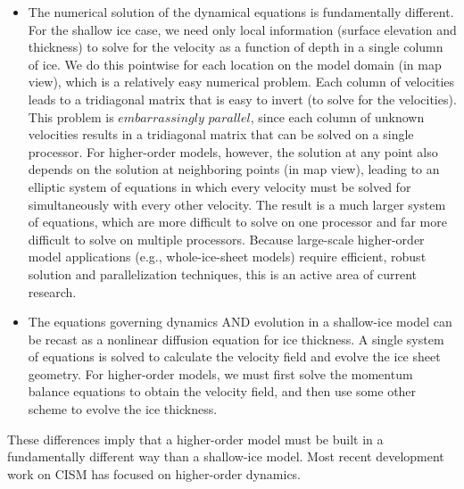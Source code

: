 \begin{itemize}
\item  The numerical solution of the dynamical equations is fundamentally different. For the shallow ice case, we need only local information (surface elevation and thickness) to solve for the velocity as a function of depth in a single column of ice. We do this pointwise for each location on the model domain (in map view), which is a relatively easy numerical problem.  Each column of velocities leads to a tridiagonal matrix that is easy to invert (to solve for the velocities). This problem is $embarrassingly$ $parallel$, since each column of unknown velocities results in a tridiagonal matrix that can be solved on a single processor. For higher-order models, however, the solution at any point also depends on the solution at neighboring points (in map view),
leading to an elliptic system of equations in which every velocity must be solved for simultaneously with every other velocity. The result is a much larger system of equations, which are more difficult to solve on one processor and far more difficult to solve on multiple processors. Because large-scale higher-order model applications (e.g., whole-ice-sheet models) require efficient, robust solution and parallelization techniques, this is an active area of current research.  
\end{itemize}

\begin{itemize}
\item  The equations governing dynamics AND evolution in a shallow-ice model can be recast as a nonlinear diffusion equation for ice thickness. A single system of equations is solved to calculate the velocity field and evolve the ice sheet geometry. For higher-order models, we must first solve the momentum balance equations to obtain the velocity field, and then use some other scheme to evolve the ice thickness. 
\end{itemize}

These differences imply that a higher-order model must be built in a fundamentally different way than a shallow-ice model.
Most recent development work on CISM has focused on higher-order dynamics.

%
%
%

